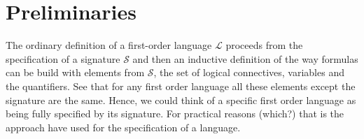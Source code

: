 \chapter{Preliminaries}
The ordinary definition of a first-order language $\mathcal{L}$ proceeds from the specification of a signature $\mathcal{S}$ and then an inductive definition of the way formulas can be build with elements from $\mathcal{S}$, the set of logical connectives, variables and the quantifiers. See that for any first order language all these elements except the signature are the same. Hence, we could think of a specific first order language as being fully specified by its signature. For practical reasons (which?) that is the approach \cite{ffl} have used for the specification of a language.




